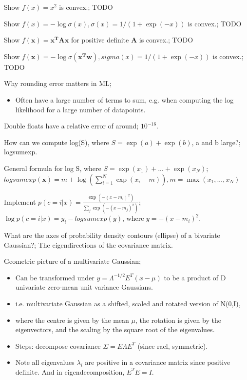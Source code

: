 \documentclass{article}
\begin{document}
Show $f(x)=x^2$ is convex.; TODO

Show $f(x) = -\log \sigma(x), \sigma(x)=1/(1+\exp(-x))$ is convex.; TODO

Show $f(\mathbf{x}) = \mathbf{x^TAx}$ for positive definite $\mathbf{A}$ is convex.; TODO

Show $f(\mathbf{x}) = -\log\sigma(\mathbf{x^Tw}),sigma(x)=1/(1+\exp(-x))$ is convex.; TODO 

Why rounding error matters in ML; \begin{itemize}
    \item Often have a large number of terms to sum, e.g. when computing the log likelihood for a large number of datapoints.
\end{itemize}

Double floats have a relative error of around; $10^{-16}$.

How can we compute log(S), where $S=\exp(a)+\exp(b)$, a and b large?; logsumexp. 

General formula for log S, where $S=\exp(x_1)+...+\exp(x_N)$; $logsumexp()=m+\log(\sum_{i=1}^N\exp(x_i-m)), m=\max(x_1,...,x_N)$

Implement $p(c=i|x)=$; $\log p(c=i|x) = y_i - logsumexp(y)$, where $y=-(x - m_i)^2$.

What are the axes of probability density contours (ellipse) of a bivariate Gaussian?; The eigendirections of the covariance matrix.

Geometric picture of a multivariate Gaussian; \begin{itemize}
    \item Can be transformed under $y=\Lambda^{-1/2}E^T(x-\mu)$ to be a product of D univariate zero-mean unit variance Gaussians.
    \item i.e. multivariate Gaussian as a shifted, scaled and rotated version of N(0,I), 
    \item where the centre is given by the mean $\mu$, the rotation is given by the eigenvectors, and the scaling by the square root of the eigenvalues.
    \item Steps: decompose covariance $\Sigma = E\Lambda E^T$ (since rael, symmetric). 
    \item Note all eigenvalues $\lambda_i$ are positive in a covariance matrix since positive definite. And in eigendecomposition, $E^TE=I$.
\end{itemize}
\end{document}
